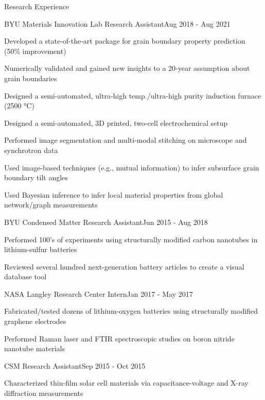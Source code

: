 \documentclass{resume} %
\begin{document}
\begin{rSection}{Research Experience}
\begin{rSubsection}{BYU Materials Innovation Lab Research Assistant}{Aug 2018 - Aug 2021}{} \\
\item Developed a state-of-the-art package for grain boundary property prediction (50\% improvement)
\item Numerically validated and gained new insights to a 20-year assumption about grain boundaries %
\item Designed a semi-automated, ultra-high temp./ultra-high purity induction furnace (2500 °C)
\item Designed a semi-automated, 3D printed, two-cell electrochemical setup
\item Performed image segmentation and multi-modal stitching on microscope and synchrotron data
\item Used image-based techniques (e.g., mutual information) to infer subsurface grain boundary tilt angles %
\item Used Bayesian inference to infer local material properties from global network/graph measurements %
\end{rSubsection}

\begin{rSubsection}{BYU Condensed Matter Research Assistant}{Jun 2015 - Aug 2018}{} \\
\item Performed 100's of experiments using structurally modified carbon nanotubes in lithium-sulfur batteries
\item Reviewed several hundred next-generation battery articles to create a visual database tool
\end{rSubsection}
\begin{rSubsection}{NASA Langley Research Center Intern}{Jan 2017 - May 2017}{} \\
\item Fabricated/tested dozens of lithium-oxygen batteries using structurally modified graphene electrodes
\item Performed Raman laser and FTIR spectroscopic studies on boron nitride nanotube materials
\end{rSubsection}
\begin{rSubsection}{CSM Research Assistant}{Sep 2015 - Oct 2015}{} \\
\item Characterized thin-film solar cell materials via capacitance-voltage and X-ray diffraction measurements
\end{rSubsection}
\end{rSection}
\end{document}
